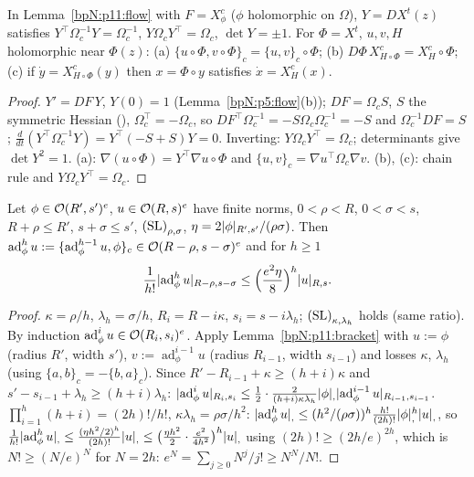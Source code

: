\begin{lemma}\label{bpN:p11:symplectic}
In Lemma~\ref{bpN:p11:flow} with $F=X^c_\phi$ ($\phi$ holomorphic on $\Omega$), $Y=DX^t(z)$ satisfies $Y^\top\Omega_c^{-1}Y=\Omega_c^{-1}$, $Y\Omega_cY^\top=\Omega_c$, $\det Y=\pm1$. For $\Phi=X^t$, $u,v,H$ holomorphic near $\Phi(z)$: (a) $\{u\circ\Phi,v\circ\Phi\}_c=\{u,v\}_c\circ\Phi$; (b) $D\Phi\,X^c_{H\circ\Phi}=X^c_H\circ\Phi$; (c) if $\dot y=X^c_{H\circ\Phi}(y)$ then $x=\Phi\circ y$ satisfies $\dot x=X^c_H(x)$.
\end{lemma}
\begin{proof}
$Y'=DF\,Y$, $Y(0)=1$ (Lemma~\ref{bpN:p5:flow}(b)); $DF=\Omega_cS$, $S$ the symmetric Hessian (), $\Omega_c^\top=-\Omega_c$, so $DF^\top\Omega_c^{-1}=-S\Omega_c\Omega_c^{-1}=-S$ and $\Omega_c^{-1}DF=S$; $\frac d{dt}(Y^\top\Omega_c^{-1}Y)=Y^\top(-S+S)Y=0$. Inverting: $Y\Omega_cY^\top=\Omega_c$; determinants give $\det Y^2=1$. (a): $\nabla(u\circ\Phi)=Y^\top\nabla u\circ\Phi$ and $\{u,v\}_c=\nabla u^\top\Omega_c\nabla v$. (b), (c): chain rule and $Y\Omega_cY^\top=\Omega_c$.
\end{proof}

\begin{lemma}\label{bpN:p11:adjoint}
Let $\phi\in\mathcal O(R',s')^e$, $u\in\mathcal O(R,s)^e$ have finite norms, $0<\rho<R$, $0<\sigma<s$, $R+\rho\le R'$, $s+\sigma\le s'$, $\textup{(SL)}_{\rho,\sigma}$, $\eta=2\lvert \phi\rvert_{R',s'}/(\rho\sigma)$. Then $\operatorname{ad}^h_\phi u:=\{\operatorname{ad}^{h-1}_\phi u,\phi\}_c\in\mathcal O(R-\rho,s-\sigma)^e$ and for $h\ge1$
\[\frac1{h!}\lvert \operatorname{ad}^h_\phi u\rvert_{R-\rho,s-\sigma}\le\Bigl(\frac{e^2\eta}8\Bigr)^h\lvert u\rvert_{R,s} .\]
\end{lemma}
\begin{proof}
\label{stepN:p11:ad-setup} $\kappa=\rho/h$, $\lambda_h=\sigma/h$, $R_i=R-i\kappa$, $s_i=s-i\lambda_h$; $\textup{(SL)}_{\kappa,\lambda_h}$ holds (same ratio). By induction $\operatorname{ad}^i_\phi u\in\mathcal O(R_i,s_i)^e$.
\label{stepN:p11:ad-step} Apply Lemma~\ref{bpN:p11:bracket} with $u:=\phi$ (radius $R'$, width $s'$), $v:=\operatorname{ad}^{i-1}_\phi u$ (radius $R_{i-1}$, width $s_{i-1}$) and losses $\kappa$, $\lambda_h$ (using $\{a,b\}_c=-\{b,a\}_c$). Since $R'-R_{i-1}+\kappa\ge(h+i)\kappa$ and $s'-s_{i-1}+\lambda_h\ge(h+i)\lambda_h$: $\lvert \operatorname{ad}^i_\phi u\rvert_{R_i,s_i}\le\frac12\cdot\frac2{(h+i)\kappa\lambda_h}\lvert \phi\rvert_{,}\lvert \operatorname{ad}^{i-1}_\phi u\rvert_{R_{i-1},s_{i-1}}$.
\label{stepN:p11:ad-prod} $\prod_{i=1}^h(h+i)=(2h)!/h!$, $\kappa\lambda_h=\rho\sigma/h^2$: $\lvert \operatorname{ad}^h_\phi u\rvert_{,}\le(h^2/(\rho\sigma))^h\frac{h!}{(2h)!}\lvert \phi\rvert_{,}^h\lvert u\rvert_{,}$, so $\frac1{h!}\lvert \operatorname{ad}^h_\phi u\rvert_{,}\le\frac{(\eta h^2/2)^h}{(2h)!}\lvert u\rvert_{,}\le\bigl(\frac{\eta h^2}2\cdot\frac{e^2}{4h^2}\bigr)^h\lvert u\rvert_{,}$ using $(2h)!\ge(2h/e)^{2h}$, which is $N!\ge(N/e)^N$ for $N=2h$: $e^N=\sum_{j\ge0}N^j/j!\ge N^N/N!$.
\end{proof}

